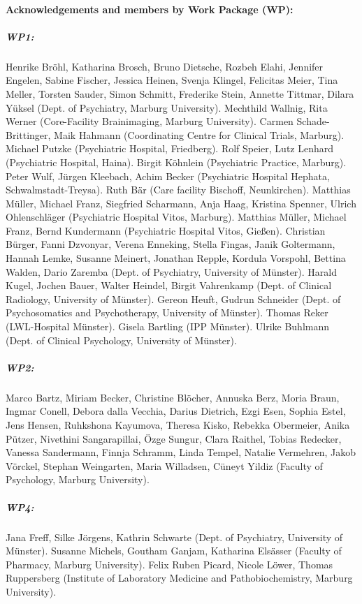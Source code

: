 \documentclass[12pt,a4paper]{article}
\begin{document}
    \paragraph{Acknowledgements and members by Work Package (WP):}

    \subparagraph{WP1:}
    Henrike Bröhl, Katharina Brosch, Bruno Dietsche, Rozbeh Elahi, Jennifer Engelen, Sabine Fischer, Jessica Heinen, Svenja Klingel, Felicitas Meier, Tina Meller, Torsten Sauder, Simon Schmitt, Frederike Stein, Annette Tittmar, Dilara Yüksel (Dept. of Psychiatry, Marburg University). Mechthild Wallnig, Rita Werner (Core-Facility Brainimaging, Marburg University). Carmen Schade-Brittinger, Maik Hahmann (Coordinating Centre for Clinical Trials, Marburg). Michael Putzke (Psychiatric Hospital, Friedberg). Rolf Speier, Lutz Lenhard (Psychiatric Hospital, Haina). Birgit Köhnlein (Psychiatric Practice, Marburg). Peter Wulf, Jürgen Kleebach, Achim Becker (Psychiatric Hospital Hephata, Schwalmstadt-Treysa). Ruth Bär (Care facility Bischoff, Neunkirchen). Matthias Müller, Michael Franz, Siegfried Scharmann, Anja Haag, Kristina Spenner, Ulrich Ohlenschläger (Psychiatric Hospital Vitos, Marburg). Matthias Müller, Michael Franz, Bernd Kundermann (Psychiatric Hospital Vitos, Gießen). Christian Bürger, Fanni Dzvonyar, Verena Enneking, Stella Fingas, Janik Goltermann, Hannah Lemke, Susanne Meinert, Jonathan Repple, Kordula Vorspohl, Bettina Walden, Dario Zaremba (Dept. of Psychiatry, University of Münster). Harald Kugel, Jochen Bauer, Walter Heindel, Birgit Vahrenkamp (Dept. of Clinical Radiology, University of Münster). Gereon Heuft, Gudrun Schneider (Dept. of Psychosomatics and Psychotherapy, University of Münster). Thomas Reker (LWL-Hospital Münster). Gisela Bartling (IPP Münster). Ulrike Buhlmann (Dept. of Clinical Psychology, University of Münster).

    \subparagraph{WP2:} Marco Bartz, Miriam Becker, Christine Blöcher, Annuska Berz, Moria Braun, Ingmar Conell, Debora dalla Vecchia, Darius Dietrich, Ezgi Esen, Sophia Estel, Jens Hensen, Ruhkshona Kayumova, Theresa Kisko, Rebekka Obermeier, Anika Pützer, Nivethini Sangarapillai, Özge Sungur, Clara Raithel, Tobias Redecker, Vanessa Sandermann, Finnja Schramm, Linda Tempel, Natalie Vermehren, Jakob Vörckel, Stephan Weingarten, Maria Willadsen, Cüneyt Yildiz (Faculty of Psychology, Marburg University).

    \subparagraph{WP4:} Jana Freff, Silke Jörgens, Kathrin Schwarte (Dept. of Psychiatry, University of Münster). Susanne Michels, Goutham Ganjam, Katharina Elsässer (Faculty of Pharmacy, Marburg University). Felix Ruben Picard, Nicole Löwer, Thomas Ruppersberg (Institute of Laboratory Medicine and Pathobiochemistry, Marburg University).
\end{document}

